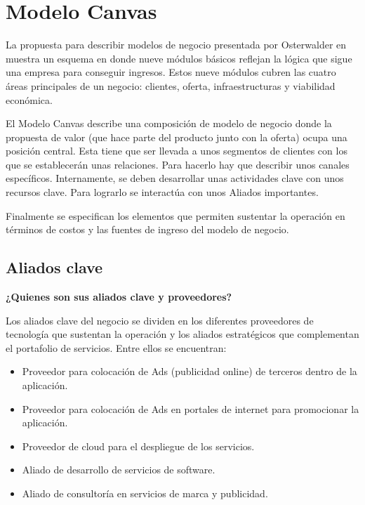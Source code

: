 
\chapter{Modelo Canvas}

La propuesta para describir modelos de negocio presentada por Osterwalder en \cite{osterwalder2004business} muestra un esquema en donde nueve módulos básicos reflejan la lógica que sigue una empresa para conseguir ingresos. Estos nueve módulos cubren las cuatro áreas principales de un negocio: clientes, oferta, infraestructuras y viabilidad económica.

El Modelo Canvas describe una composición de modelo de negocio donde la propuesta de valor (que hace parte del producto junto con la oferta) ocupa una posición central. Esta tiene que ser llevada a unos segmentos de clientes con los que se establecerán unas relaciones. Para hacerlo hay que describir unos canales específicos. Internamente, se deben desarrollar unas actividades clave con unos recursos clave. Para lograrlo se interactúa con unos Aliados importantes. 

Finalmente se especifican los elementos que permiten sustentar la operación en términos de costos y las fuentes de ingreso del modelo de negocio.

\section{Aliados clave}

\textbf{¿Quienes son sus aliados clave y proveedores?}

Los aliados clave del negocio se dividen en los diferentes proveedores de tecnología que sustentan la operación y los aliados estratégicos que complementan el portafolio de servicios. Entre ellos se encuentran:

\begin{itemize}
    \item Proveedor para colocación de Ads (publicidad online) de terceros dentro de la aplicación.
    \item Proveedor para colocación de Ads en portales de internet para promocionar la aplicación.
    \item Proveedor de cloud para el despliegue de los servicios.
    \item Aliado de desarrollo de servicios de software.
    \item Aliado de consultoría en servicios de marca y publicidad.
  
\end{itemize}

